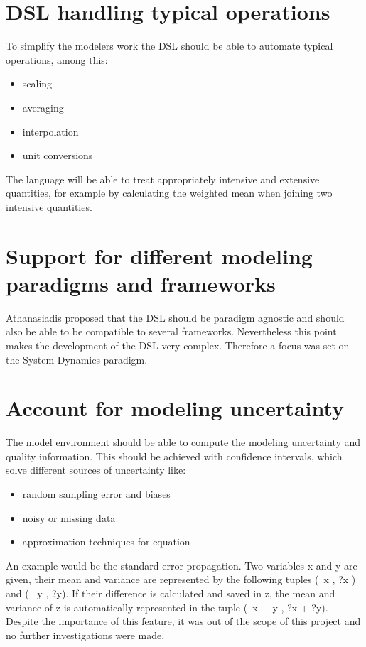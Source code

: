 \section{DSL handling typical operations}

To simplify the modelers work the DSL should be able to automate typical operations, among this:

\begin{itemize}
	\item scaling
	\item averaging
	\item interpolation
	\item unit conversions
\end{itemize}

The language will be able to treat appropriately intensive and extensive quantities, for example by calculating the weighted mean when joining two intensive quantities.

\section{Support for different modeling paradigms and frameworks}

Athanasiadis proposed that the DSL should be paradigm agnostic and should also be able to be compatible to several frameworks. Nevertheless this point makes the development of the DSL very complex. Therefore a focus was set on the System Dynamics paradigm.

\section{Account for modeling uncertainty}

The model environment should be able to compute the modeling uncertainty and quality information. This should be achieved with confidence intervals, which solve different sources of uncertainty like:

\begin{itemize}
	\item random sampling error and biases
	\item noisy or missing data
	\item approximation techniques for equation
\end{itemize}

An example would be the standard error propagation. Two variables x and y are given, their mean and variance are represented by the following tuples (\textmu ~x , ?x ) and (\textmu~ y , ?y). If their difference is calculated and saved in z, the mean and variance of z is automatically represented in the tuple  (\textmu~x - \textmu~y , ?x + ?y).
Despite the importance of this feature, it was out of the scope of this project and no further investigations were made.


